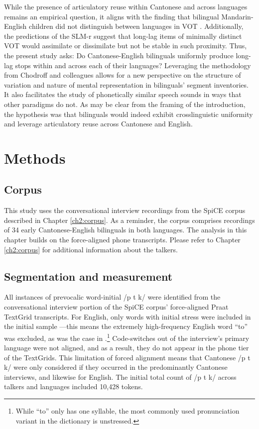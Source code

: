 While the presence of articulatory reuse within Cantonese and across languages remains an empirical question, it aligns with the finding that bilingual Mandarin-English children did not distinguish between languages in VOT \citep{yang_2019_vot}. Additionally, the predictions of the SLM-r \citep{flege_2021_slmr} suggest that long-lag items of minimally distinct VOT would assimilate or dissimilate but not be stable in such proximity. Thus, the present study asks: Do Cantonese-English bilinguals uniformly produce long-lag stops within and across each of their languages? Leveraging the methodology from Chodroff and colleagues \citep{chodroff_2017_structure, chodroff_2018_predictability, chodroff_2019_l2} allows for a new perspective on the structure of variation and nature of mental representation in bilinguals' segment inventories. It also facilitates the study of phonetically similar speech sounds in ways that other paradigms do not. As may be clear from the framing of the introduction, the hypothesis was that bilinguals would indeed exhibit crosslinguistic uniformity and leverage articulatory reuse across Cantonese and English.

\section{Methods}

\subsection{Corpus}

This study uses the conversational interview recordings from the SpiCE corpus described in Chapter \ref{ch2:corpus}. As a reminder, the corpus comprises recordings of 34 early Cantonese-English bilinguals in both languages. The analysis in this chapter builds on the force-aligned phone transcripts. Please refer to Chapter \ref{ch2:corpus} for additional information about the talkers. 

\subsection{Segmentation and measurement}

All instances of prevocalic word-initial /p t k/ were identified from the conversational interview portion of the SpiCE corpus' force-aligned Praat TextGrid transcripts. For English, only words with initial stress were included in the initial sample \citep{lisker_1967_some}---this means the extremely high-frequency English word ``to'' was excluded, as was the case in \citet{chodroff_2017_structure}.\footnote{While ``to'' only has one syllable, the most commonly used pronunciation variant in the dictionary is unstressed.} Code-switches out of the interview's primary language were not aligned, and as a result, they do not appear in the phone tier of the TextGrids. This limitation of forced alignment means that Cantonese /p t k/ were only considered if they occurred in the predominantly Cantonese interviews, and likewise for English. The initial total count of /p t k/ across talkers and languages included 10,428 tokens. 

